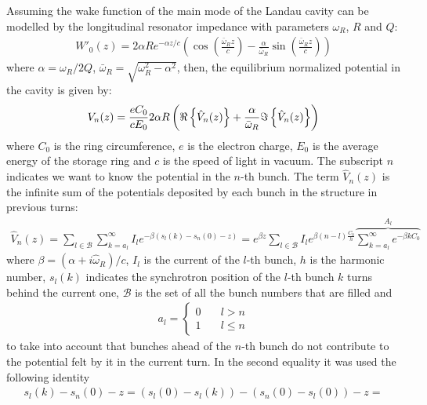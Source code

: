 \begin{apendicesenv}
    Assuming the wake function of the main mode of the Landau cavity can be modelled by the longitudinal resonator impedance with parameters $\omega_R$, $R$ and $Q$:
    \begin{align}\label{eq:longitudinal_resonator_wake}
        W'_0(z) = 2\alpha Re^{-\alpha z/c}\left(\cos\left(\frac{\bar{\omega}_Rz}{c}\right)-
                                \frac{\alpha}{\bar{\omega}_R}
                                    \sin\left(\frac{\bar{\omega}_Rz}{c}\right)\right)
    \end{align}
    where $\alpha = \omega_R/2Q$, $\bar{\omega}_R=\sqrt{\omega_R^2-\alpha^2}$, then, the equilibrium normalized potential in the cavity is given by:
    \begin{align}\label{eq:total_potential}
        V_n(z) = \frac{eC_0}{cE_0}2\alpha R\left(\Re\left\{\hat{V}_n(z)\right\}+\frac{\alpha}{\bar{\omega}_R}\Im\left\{\hat{V}_n(z)\right\}\right)
    \end{align}
    where $C_0$ is the ring circumference, $e$ is the electron charge, $E_0$ is the average energy of the storage ring and $c$ is the speed of light in vacuum. The subscript $n$ indicates we want to know the potential in the $n$-th bunch. The term $\hat{V}_n(z)$ is the infinite sum of the potentials deposited by each bunch in the structure in previous turns:
    \begin{align}
        \hat{V}_n(z) = \sum_{l\in\mathscr{B}} \sum_{k=a_l}^\infty I_l e^{-\beta (s_l(k) - s_n(0)-z)}=
                    e^{\beta z}\sum_{l\in\mathscr{B}}I_l e^{\beta(n-l)\frac{C_0}{h}}
                    \overbrace{\sum_{k=a_l}^\infty e^{-\beta k C_0}}^{A_l}
    \end{align}
    where $\beta = (\alpha + i \hat{\omega}_R) / c$, $I_l$ is the current of the $l$-th bunch, $h$ is the harmonic number, $s_l(k)$ indicates the synchrotron position of the $l$-th bunch $k$ turns behind the current one, $\mathscr{B}$ is the set of all the bunch numbers that are filled and
    \begin{align}
        a_l = \left\{\begin{aligned}0\quad &l > n\\1\quad &l\leq n\end{aligned}\right.
    \end{align}
    to take into account that bunches ahead of the $n$-th bunch do not contribute to the potential  felt by it in the current turn. In the second equality it was used the following identity
    \begin{align}
        s_l(k) - s_n(0) - z = \left(s_l(0) - s_l(k)\right) - \left(s_n(0) - s_l(0)\right) - z =

\end{align}
\end{apendicesenv}

